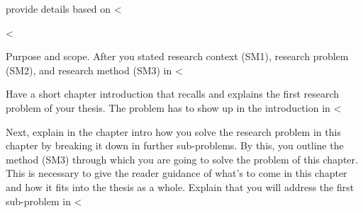 \documentclass[runningheads,a4paper,english]{llncs}[2018/03/10]
\begin{document}
{provide details based on <%



<%

\textsf{Purpose and scope}. After you stated research context (SM1), research problem (SM2), and research method (SM3) in <%

Have a short chapter introduction that recalls and explains the first research problem of your thesis. The problem has to show up in the introduction in <%

Next, explain in the chapter intro how you solve the research problem in this chapter by breaking it down in further sub-problems. By this, you outline the method (SM3) through which you are going to solve the problem of this chapter. This is necessary to give the reader guidance of what's to come in this chapter and how it fits into the thesis as a whole. Explain that you will address the first sub-problem in <%

}
\end{document}
